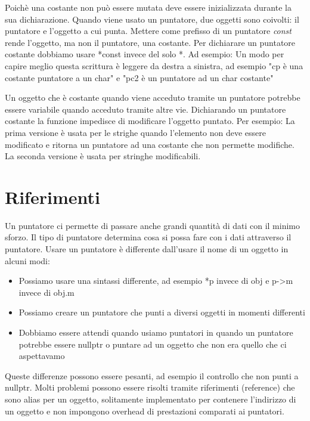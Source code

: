 \documentclass[11pt,a4paper]{book}
\begin{document}
Poichè una costante non può essere mutata deve essere inizializzata durante la sua dichiarazione.
\label{code: 094}
Quando viene usato un puntatore, due oggetti sono coivolti: il puntatore e l'oggetto a cui punta. Mettere come prefisso di un puntatore \emph{const} rende l'oggetto, ma non il puntatore, una costante. Per dichiarare un puntatore costante dobbiamo usare *const invece del solo *. Ad esempio:
\label{code: 093}
Un modo per capire meglio questa scrittura è leggere da destra a sinistra, ad esempio "cp è una costante puntatore a un char" e "pc2 è un puntatore ad un char costante"

Un oggetto che è costante quando viene acceduto tramite un puntatore potrebbe essere variabile quando acceduto tramite altre vie. Dichiarando un puntatore costante la funzione impedisce di modificare l'oggetto puntato. Per esempio:
\label{code: 095}
La prima versione è usata per le strighe quando l'elemento non deve essere modificato e ritorna un puntatore ad una costante che non permette modifiche. La seconda versione è usata per stringhe modificabili.

\section{Riferimenti}
Un puntatore ci permette di passare anche grandi quantità di dati con il minimo sforzo. Il tipo di puntatore determina cosa si possa fare con i dati attraverso il puntatore. Usare un puntatore è differente dall'usare il nome di un oggetto in alcuni modi:
\begin{itemize}
	\item Possiamo usare una sintassi differente, ad esempio *p invece di obj e p->m invece di obj.m
	\item Possiamo creare un puntatore che punti a diversi oggetti in momenti differenti
	\item Dobbiamo essere attendi quando usiamo puntatori in quando un puntatore potrebbe essere nullptr o puntare ad un oggetto che non era quello che ci aspettavamo
\end{itemize}

Queste differenze possono essere pesanti, ad esempio il controllo che non punti a nullptr. Molti problemi possono essere risolti tramite riferimenti (reference) che sono alias per un oggetto, solitamente implementato per contenere l'indirizzo di un oggetto e non impongono overhead di prestazioni comparati ai puntatori.
\end{document}
